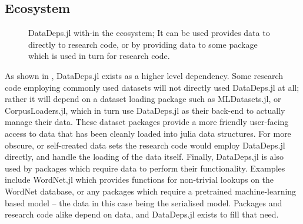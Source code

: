 \documentclass[twoside,11pt]{article}
\begin{document}
\subsection{Ecosystem}

\begin{figure}
	\centering
	\caption{DataDeps.jl with-in the ecosystem; It can be used provides data to directly to research code, or by providing data to some package which is used in turn for research code. \label{fig:eco}}
\end{figure}

As shown in , DataDeps.jl exists as a higher level dependency.
Some research code employing commonly used datasets will not directly used DataDeps.jl at all;
rather it will depend on a dataset loading package such as MLDatasets.jl,
or CorpusLoaders.jl, which in turn use DataDeps.jl as their back-end to actually manage their data.
These dataset packages provide a more friendly user-facing access to data that has been cleanly loaded into julia data structures.
For more obscure, or self-created data sets the research code would employ DataDeps.jl directly, and handle the loading of the data itself.
Finally, DataDeps.jl is also used by packages which require data to perform their functionality.
Examples include WordNet.jl which provides functions for non-trivial lookups on the WordNet \citep{miller1995wordnet} database,
or any packages which require a pretrained machine-learning based model -- the data in this case being the serialised model.
Packages and research code alike depend on data, and DataDeps.jl exists to fill that need.
\end{document}

